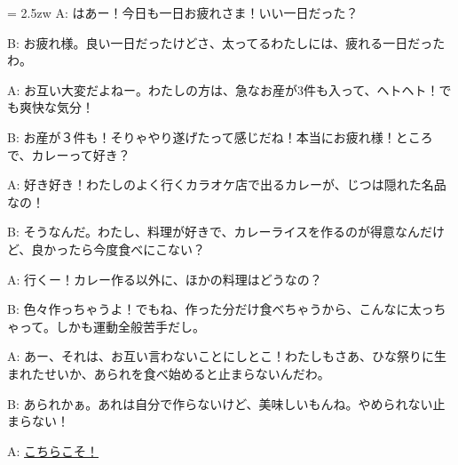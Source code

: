 \documentclass[11pt]{amsart}
\title{}
\author{}
\newenvironment{hangall}[1]{\hangindent = 2.5zw\everypar{\hangindent = 2.5zw}}{}
\begin{document}
\maketitle
\begin{hangall}{}%
A: はあー！今日も一日お疲れさま！いい一日だった？

B: お疲れ様。良い一日だったけどさ、太ってるわたしには、疲れる一日だったわ。

A: お互い大変だよねー。わたしの方は、急なお産が3件も入って、ヘトヘト！でも爽快な気分！

B: お産が３件も！そりゃやり遂げたって感じだね！本当にお疲れ様！ところで、カレーって好き？

A: 好き好き！わたしのよく行くカラオケ店で出るカレーが、じつは隠れた名品なの！

B: そうなんだ。わたし、料理が好きで、カレーライスを作るのが得意なんだけど、良かったら今度食べにこない？

A: 行くー！カレー作る以外に、ほかの料理はどうなの？

B: 色々作っちゃうよ！でもね、作った分だけ食べちゃうから、こんなに太っちゃって。しかも運動全般苦手だし。

A: あー、それは、お互い言わないことにしとこ！わたしもさあ、ひな祭りに生まれたせいか、あられを食べ始めると止まらないんだわ。

B: あられかぁ。あれは自分で作らないけど、美味しいもんね。やめられない止まらない！

A: \ul{こちらこそ！}\end{hangall}
\end{document}
